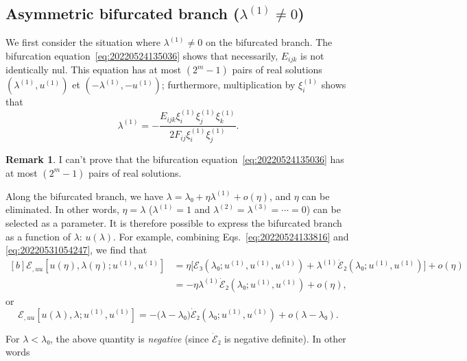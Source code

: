 \documentclass[12pt, final]{scrartcl}
\theoremstyle{definition}
\newtheorem{remark}{Remark}
\newcommand{\E}{\mathcal E}
\newcommand{\order}[2][1]{#2^{(#1)}}
\begin{document}
\subsection{Asymmetric bifurcated branch ($\order[1]\lambda ≠ 0$)}

We first consider the situation where $\order[1]\lambda ≠ 0$ on the bifurcated
branch. The bifurcation equation~\eqref{eq:20220524135036} shows that
necessarily, $E_{ijk}$ is not identically nul. This equation has at most
$(2^m - 1)$ pairs of real solutions $(\order[1]\lambda, \order[1]u)$ et
$(- \order[1]\lambda, - \order[1]u)$; furthermore, multiplication by
$\order[1]{ξ_i}$ shows that
\begin{equation}
  \label{eq:20220801085236}
  \order[1]\lambda = -\frac{E_{ijk} \order[1]{ξ_i} \order[1]{ξ_j} \order[1]{ξ_k}}{2 F_{ij} \order[1]{ξ_i} \order[1]{ξ_j}}.
\end{equation}

\begin{remark}
  I can't prove that the bifurcation equation~\eqref{eq:20220524135036} has at
  most $(2^m - 1)$ pairs of real solutions.
\end{remark}

Along the bifurcated branch, we have $\lambda = \lambda₀ + η \order[1]\lambda + o(η)$, and $η$ can be
eliminated. In other words, $η=\lambda$ ($\order[1]\lambda=1$ and $\order[2]\lambda = \order[3]\lambda = \cdots = 0$) can
be selected as a parameter. It is therefore possible to express the bifurcated
branch as a function of $\lambda$: $u(\lambda)$. For example, combining
Eqs.~\eqref{eq:20220524133816} and \eqref{eq:20220531054247}, we find that
\begin{equation}
  \begin{aligned}[b]
    \E_{, uu}[u(η), \lambda(η); \order[1]u, \order[1]u]
    &= η \bigl[\E₃(\lambda₀ ; \order[1]u, \order[1]u, \order[1]u)  + \order[1]\lambda \dot{\E}₂(\lambda₀; \order[1]u, \order[1]u)\bigr] + o(η)\\
    &= - η \order[1]\lambda \dot{\E}₂(\lambda₀; \order[1]u, \order[1]u) + o(η),
  \end{aligned}
\end{equation}
or
\begin{equation}
  \label{eq:20220819160235}
  \E_{, uu}[u(\lambda), \lambda; \order[1]u, \order[1]u] = -\bigl( \lambda - \lambda₀ \bigr) \dot{\E}₂(\lambda₀; \order[1]u, \order[1]u) + o(\lambda - \lambda₀).
\end{equation}

For $\lambda < \lambda₀$, the above quantity is \emph{negative} (since $\dot{\E}₂$ is
negative definite). In other words
\end{document}
